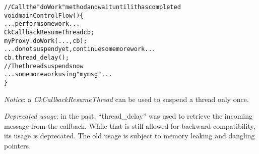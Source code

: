 \begin{alltt}
// Call the "doWork" method and wait until it has completed
void mainControlFlow() \{
  ...perform some work...
  CkCallbackResumeThread cb;
  myProxy.doWork(...,cb);
  ...do not suspend yet, continue some more work...
  cb.thread\_delay();
  // The thread suspends now
  ...some more work using "mymsg"...
\}
\end{alltt}

{\em Notice}: a {\em CkCallbackResumeThread} can be used to suspend a thread
only once.

{\em Deprecated usage}: in the past, ``thread\_delay'' was used to retrieve the
incoming message from the callback. While that is still allowed for backward
compatibility, its usage is deprecated. The old usage is subject to memory
leaking and dangling pointers.







